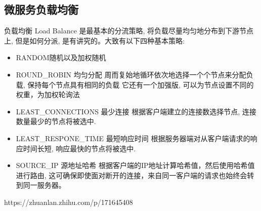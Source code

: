 \documentclass[../../../interview-questions.tex]{subfiles}
\begin{document}
\subsection{微服务负载均衡}

负载均衡 Load Balance 是最基本的分流策略, 将负载尽量均匀地分布到下游节点上, 但是如何分派, 是有讲究的。大致有以下四种基本策略:

\begin{itemize}
    \item{RANDOM随机以及加权随机}
    \item{ROUND\_ROBIN 均匀分配
    周而复始地循环依次地选择一个个节点来分配负载, 保持每个节点具有相同的负载
    它还有一个加强版, 可以为节点设置不同的权重，为加权轮询法}
    \item {LEAST\_CONNECTIONS 最少连接
    根据客户端建立的连接数选择节点, 连接数量最少的节点将被选中.}
    \item {LEAST\_RESPONE\_TIME 最短响应时间
    根据服务器端对从客户端请求的响应时间长短, 响应最快的节点将被选中.}
    \item {SOURCE\_IP 源地址哈希
    根据客户端的IP地址计算哈希值，然后使用哈希值进行路由, 这可确保即使面对断开的连接，来自同一客户端的请求也始终会转到同一服务器。}
\end{itemize}

https://zhuanlan.zhihu.com/p/171645408
\end{document}
